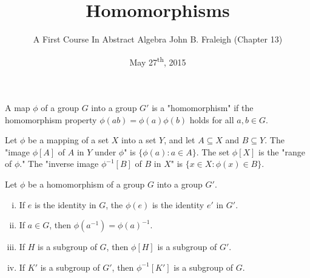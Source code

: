 \documentclass[a4paper,8pt]{article}
\title{Homomorphisms}
\author{A First Course In Abstract Algebra John B. Fraleigh (Chapter 13)}
\date{May 27\textsuperscript{th}, 2015}
\begin{document}
\maketitle
{}

\begin{outline}

    A map \(\phi\) of a group \(G\) into a group \(G'\) is a "homomorphism" if the
    homomorphism property \(\phi(ab) = \phi(a)\phi(b)\) holds for all \(a, b \in G\).

    Let \(\phi\) be a mapping of a set \(X\) into a set \(Y\), and let \(A \subseteq X\)
    and \(B \subseteq Y\). The "image \(\phi[A]\) of \(A\) in \(Y\) under \(\phi\)" is \(\{\phi(a) : a \in A\}\).
    The set \(\phi[X]\) is the "range of \(\phi\)." The "inverse image \(\phi^{-1}[B]\) of \(B\) in \(X\)" is
    \(\{x \in X : \phi(x) \in B\}\).

    Let \(\phi\) be a homomorphism of a group \(G\) into a group \(G'\).
    \begin{enumerate}[i.]
      \item If \(e\) is the identity in \(G\), the \(\phi(e)\) is the identity \(e'\) in \(G'\).
      \item If \(a \in G\), then \(\phi(a^{-1}) = \phi(a)^{-1}\).
      \item If \(H\) is a subgroup of \(G\), then \(\phi[H]\) is a subgroup of \(G'\).
      \item If \(K'\) is a subgroup of \(G'\), then \(\phi^{-1}[K']\) is a subgroup of \(G\).
    \end{enumerate}


\end{outline}
\end{document}
